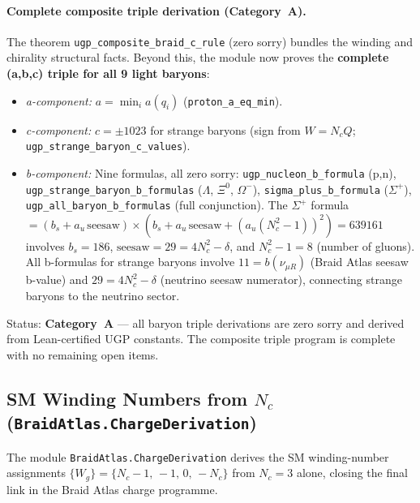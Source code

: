 \documentclass[11pt,a4paper]{article}
\theoremstyle{definition}
\begin{document}
\paragraph{Complete composite triple derivation (Category~A).}
The theorem \lstinline|ugp_composite_braid_c_rule| (zero sorry) bundles the
winding and chirality structural facts.
Beyond this, the module now proves the \textbf{complete (a,b,c) triple for all 9 light baryons}:

\begin{itemize}[leftmargin=1.2em,itemsep=2pt]
  \item \emph{a-component:} $a = \min_i a(q_i)$ (\lstinline|proton_a_eq_min|).
  \item \emph{c-component:} $c = \pm 1023$ for strange baryons (sign from $W = N_c Q$;
    \lstinline|ugp_strange_baryon_c_values|).
  \item \emph{b-component:} Nine formulas, all zero sorry:
    \lstinline|ugp_nucleon_b_formula| (p,n),
    \lstinline|ugp_strange_baryon_b_formulas| ($\Lambda$, $\Xi^0$, $\Omega^-$),
    \lstinline|sigma_plus_b_formula| ($\Sigma^+$),
    \lstinline|ugp_all_baryon_b_formulas| (full conjunction).
    The $\Sigma^+$ formula $= (b_s{+}a_u\,\mathrm{seesaw})\times(b_s{+}a_u\,\mathrm{seesaw}{+}(a_u(N_c^2{-}1))^2) = 639161$
    involves $b_s=186$, $\mathrm{seesaw}=29=4N_c^2{-}\delta$, and $N_c^2{-}1=8$ (number of gluons).
    All b-formulas for strange baryons involve $11 = b(\nu_{\mu R})$ (Braid Atlas seesaw b-value)
    and $29 = 4N_c^2{-}\delta$ (neutrino seesaw numerator), connecting strange baryons
    to the neutrino sector.
\end{itemize}

Status: \textbf{Category~A} — all baryon triple derivations are zero sorry and
derived from Lean-certified UGP constants.
The composite triple program is complete with no remaining open items.

\subsection{SM Winding Numbers from $N_c$ (\texttt{BraidAtlas.ChargeDerivation})}
\label{subsec:charge_derivation_lean}

The module \texttt{BraidAtlas.ChargeDerivation}
derives the SM winding-number assignments $\{W_g\} = \{N_c{-}1,\,-1,\,0,\,-N_c\}$
from $N_c = 3$ alone, closing the final link in the Braid Atlas charge programme.
\end{document}
